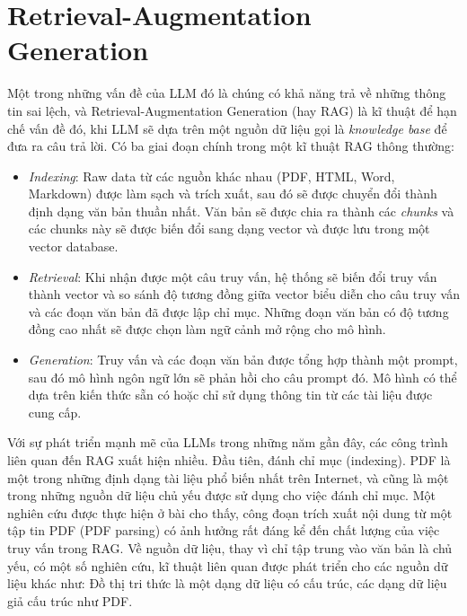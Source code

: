 \section{Retrieval-Augmentation Generation}
Một trong những vấn đề của LLM đó là chúng có khả năng trả về những thông tin sai lệch, và Retrieval-Augmentation Generation (hay RAG) là kĩ thuật để hạn chế vấn đề đó, khi LLM sẽ dựa trên một nguồn dữ liệu gọi là \emph{knowledge base} để đưa ra câu trả lời. Có ba giai đoạn chính trong một kĩ thuật RAG\cite{gao2024retrievalaugmentedgenerationlargelanguage} thông thường:
\begin{itemize}
    \item \emph{Indexing}: Raw data từ các nguồn khác nhau (PDF, HTML, Word, Markdown) được làm sạch và trích xuất, sau đó sẽ được chuyển đổi thành định dạng văn bản thuần nhất. Văn bản sẽ được chia ra thành các \emph{chunks} và các chunks này sẽ được biến đổi sang dạng vector và được lưu trong một vector database.
    \item \emph{Retrieval}: Khi nhận được một câu truy vấn, hệ thống sẽ biến đổi truy vấn thành vector và so sánh độ tương đồng giữa vector biểu diễn cho câu truy vấn và các đoạn văn bản đã được lập chỉ mục. Những đoạn văn bản có độ tương đồng cao nhất sẽ được chọn làm ngữ cảnh mở rộng cho mô hình.
    \item \emph{Generation}: Truy vấn và các đoạn văn bản được tổng hợp thành một prompt, sau đó mô hình ngôn ngữ lớn sẽ phản hồi cho câu prompt đó. Mô hình có thể dựa trên kiến thức sẵn có hoặc chỉ sử dụng thông tin từ các tài liệu được cung cấp.
\end{itemize}
Với sự phát triển mạnh mẽ của LLMs trong những năm gần đây, các công trình liên quan đến RAG xuất hiện nhiều. Đầu tiên, đánh chỉ mục (indexing). PDF là một trong những định dạng tài liệu phổ biến nhất trên Internet, và cũng là một trong những nguồn dữ liệu chủ yếu được sử dụng cho việc đánh chỉ mục. Một nghiên cứu được thực hiện ở bài \cite{lin2024revolutionizingretrievalaugmentedgenerationenhanced} cho thấy, công đoạn trích xuất nội dung từ một tập tin PDF (PDF parsing) có ảnh hưởng rất đáng kể đến chất lượng của việc truy vấn trong RAG. Về nguồn dữ liệu, thay vì chỉ tập trung vào văn bản là chủ yếu, có một số nghiên cứu, kĩ thuật liên quan được phát triển cho các nguồn dữ liệu khác như: Đồ thị tri thức là một dạng dữ liệu có cấu trúc, các dạng dữ liệu giả cấu trúc như PDF\cite{gao2024retrievalaugmentedgenerationlargelanguage}.
